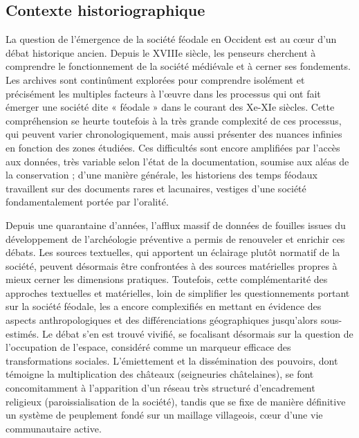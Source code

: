 \subsection{Contexte historiographique}

{\redroman
	La question de l'émergence de la société féodale en Occident est au cœur d'un débat historique ancien.
	Depuis le XVIIIe siècle, les penseurs cherchent à comprendre le fonctionnement de la société médiévale et à cerner ses fondements.
	Les archives sont continûment explorées pour comprendre isolément et précisément les multiples facteurs à l'œuvre dans les processus qui ont fait émerger une société dite « féodale » dans le courant des Xe-XIe siècles.
	Cette compréhension se heurte toutefois à la très grande complexité de ces processus, qui peuvent varier chronologiquement, mais aussi présenter des nuances infinies en fonction des zones étudiées.
	Ces difficultés sont encore amplifiées par l'accès aux données, très variable selon l'état de la documentation, soumise aux aléas de la conservation ; d'une manière générale, les historiens des temps féodaux travaillent sur des documents rares et lacunaires, vestiges d'une société fondamentalement portée par l'oralité.
	
	Depuis une quarantaine d'années, l'afflux massif de données de fouilles issues du développement de l'archéologie préventive a permis de renouveler et enrichir ces débats.
	Les sources textuelles, qui apportent un éclairage plutôt normatif de la société, peuvent désormais être confrontées à des sources matérielles propres à mieux cerner les dimensions pratiques.
	Toutefois, cette complémentarité des approches textuelles et matérielles, loin de simplifier les questionnements portant sur la société féodale, les a encore complexifiés en mettant en évidence des aspects anthropologiques et des différenciations géographiques jusqu'alors sous-estimés.
	Le débat s'en est trouvé vivifié, se focalisant désormais sur la question de l'occupation de l'espace, considéré comme un marqueur efficace des transformations sociales.
	L'émiettement et la dissémination des pouvoirs, dont témoigne la multiplication des châteaux (seigneuries châtelaines), se font concomitamment à l'apparition d'un réseau très structuré d'encadrement religieux (paroissialisation de la société), tandis que se fixe de manière définitive un système de peuplement fondé sur un maillage villageois, cœur d'une vie communautaire active.
	
}
